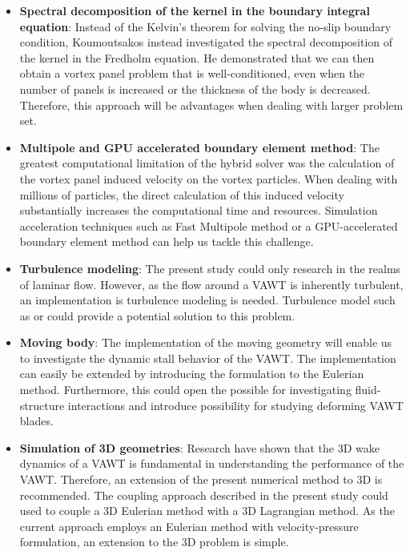 \begin{itemize}
\item \textbf{Spectral decomposition of the kernel in the boundary integral equation}: Instead of the Kelvin's theorem for solving the no-slip boundary condition, Koumoutsakos \cite{Koumoutsakos1993a} instead investigated the spectral decomposition of the kernel in the Fredholm equation. He demonstrated that we can then obtain a vortex panel problem that is well-conditioned, even when the number of panels is increased or the thickness of the body is decreased. Therefore, this approach will be advantages when dealing with larger problem set.

\item \textbf{Multipole and GPU accelerated boundary element method}: The greatest computational limitation of the hybrid solver was the calculation of the vortex panel induced velocity on the vortex particles. When dealing with millions of particles, the direct calculation of this induced velocity substantially increases the computational time and resources. Simulation acceleration techniques such as Fast Multipole method or a GPU-accelerated boundary element method can help us tackle this challenge.

\item \textbf{Turbulence modeling}: The present study could only research in the realms of laminar flow. However, as the flow around a VAWT is inherently turbulent, an implementation is turbulence modeling is needed. Turbulence model such as  or  could provide a potential solution to this problem.

\item \textbf{Moving body}: The implementation of the moving geometry will enable us to investigate the dynamic stall behavior of the VAWT. The implementation can easily be extended by introducing the  formulation to the Eulerian method. Furthermore, this could open the possible for investigating fluid-structure interactions and introduce possibility for studying deforming VAWT blades.

\item \textbf{Simulation of 3D geometries}: Research have shown that the 3D wake dynamics of a VAWT is fundamental in understanding the performance of the VAWT. Therefore, an extension of the present numerical method to 3D is recommended. The coupling approach described in the present study could used to couple a 3D Eulerian method with a 3D Lagrangian method. As the current approach employs an Eulerian method with velocity-pressure formulation, an extension to the 3D problem is simple.


\end{itemize}

